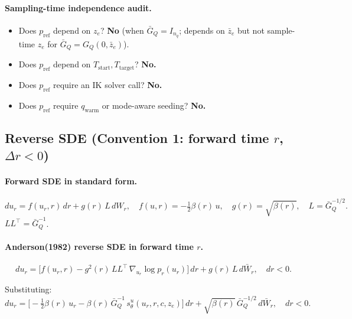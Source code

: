 \documentclass[11pt,a4paper]{article}
\newcommand{\GQ}{G_Q}
\newcommand{\GQbar}{\bar G_Q}
\begin{document}
\paragraph{Sampling-time independence audit.}
\begin{itemize}[noitemsep]
    \item Does $p_\text{ref}$ depend on $z_e$? \textbf{No} (when $\GQbar = I_{n_q}$; depends on $\bar z_e$ but not sample-time $z_e$ for $\GQbar = \GQ(0, \bar z_e)$).
    \item Does $p_\text{ref}$ depend on $T_\text{start}, T_\text{target}$? \textbf{No.}
    \item Does $p_\text{ref}$ require an IK solver call? \textbf{No.}
    \item Does $p_\text{ref}$ require $q_\text{warm}$ or mode-aware seeding? \textbf{No.}
\end{itemize}

\subsection{Reverse SDE (Convention 1: forward time \texorpdfstring{$r$}{r}, \texorpdfstring{$\Delta r < 0$}{Delta r < 0})}
\label{sec:reverse-sde}

\paragraph{Forward SDE in standard form.}
\begin{equation}
du_r = f(u_r, r)\, dr + g(r)\, L\, dW_r, \quad f(u, r) = -\tfrac{1}{2}\beta(r)\, u, \quad g(r) = \sqrt{\beta(r)}, \quad L = \GQbar^{-1/2}.
\end{equation}
$LL^\top = \GQbar^{-1}$.

\paragraph{Anderson(1982) reverse SDE in forward time $r$.}
\begin{equation}
\boxed{ du_r = \bigl[f(u_r, r) - g^2(r)\, LL^\top\, \nabla_{u_r} \log p_r(u_r)\bigr]\, dr + g(r)\, L\, d\bar W_r, \quad dr < 0. }
\end{equation}

Substituting:
\begin{equation}
du_r = \bigl[-\tfrac{1}{2}\beta(r)\, u_r - \beta(r)\, \GQbar^{-1}\, s_\theta^u(u_r, r, c, z_e)\bigr]\, dr + \sqrt{\beta(r)}\, \GQbar^{-1/2}\, d\bar W_r, \quad dr < 0.
\end{equation}
\end{document}

